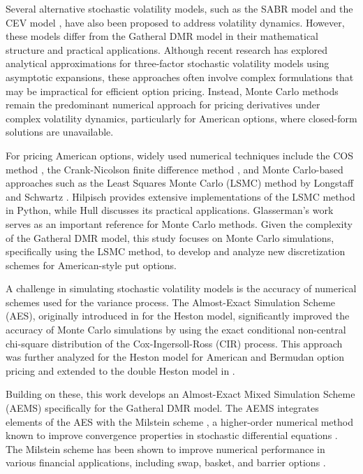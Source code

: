 \documentclass[graybox]{svmult}
\begin{document}
Several alternative stochastic volatility models, such as the SABR model \cite{hagan2002managing} and the CEV model \cite{cox1976valuation}, have also been proposed to address volatility dynamics. However, these models differ from the Gatheral DMR model in their mathematical structure and practical applications. Although recent research \cite{kil2022closed} has explored analytical approximations for three-factor stochastic volatility models using asymptotic expansions, these approaches often involve complex formulations that may be impractical for efficient option pricing. Instead, Monte Carlo methods remain the predominant numerical approach for pricing derivatives under complex volatility dynamics, particularly for American options, where closed-form solutions are unavailable.

For pricing American options, widely used numerical techniques include the COS method \cite{benchmark_test1}, the Crank-Nicolson finite difference method \cite{hirsa2013computational}, and Monte Carlo-based approaches such as the Least Squares Monte Carlo (LSMC) method by Longstaff and Schwartz \cite{longstaff2001valuing}. Hilpisch \cite{hilpisch2015derivatives} provides extensive implementations of the LSMC method in Python, while Hull \cite{hull2003options} discusses its practical applications. Glasserman's work \cite{glasserman2004monte} serves as an important reference for Monte Carlo methods. Given the complexity of the Gatheral DMR model, this study focuses on Monte Carlo simulations, specifically using the LSMC method, to develop and analyze new discretization schemes for American-style put options.

A challenge in simulating stochastic volatility models is the accuracy of numerical schemes used for the variance process. The Almost-Exact Simulation Scheme (AES), originally introduced in \cite{oosterlee2019mathematical} for the Heston model, significantly improved the accuracy of Monte Carlo simulations by using the exact conditional non-central chi-square distribution of the Cox-Ingersoll-Ross (CIR) process. This approach was further analyzed for the Heston model for American and Bermudan option pricing and extended to the double Heston model in \cite{kalicanin2022bermudan}. 

Building on these, this work develops an Almost-Exact Mixed Simulation Scheme (AEMS) specifically for the Gatheral DMR model. The AEMS integrates elements of the AES with the Milstein scheme \cite{mil1975approximate}, a higher-order numerical method known to improve convergence properties in stochastic differential equations \cite{fadugba2013convergence, giles2013analysis}. The Milstein scheme has been shown to improve numerical performance in various financial applications, including swap, basket, and barrier options \cite{fadugba2013convergence}.
\end{document}
